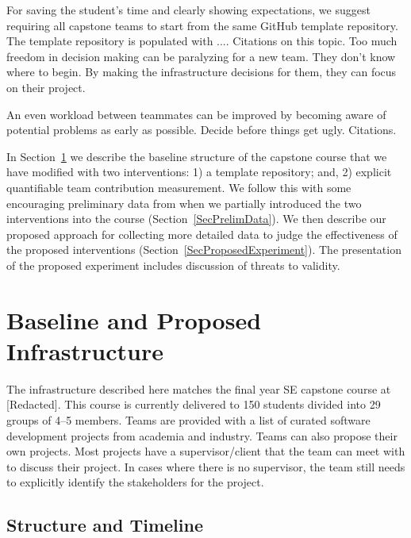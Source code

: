 \documentclass[10pt, conference]{IEEEtran}
\begin{document}
For saving the student's time and clearly showing expectations, we suggest
requiring all capstone teams to start from the same GitHub template repository.
The template repository is populated with ....  Citations on this topic. Too much freedom in decision making can be paralyzing for a new team.  They don't know where to begin.  By making the infrastructure decisions for them, they can focus on their project.

An even workload between teammates can be improved by becoming aware of
potential problems as early as possible. Decide before things get ugly.
Citations.

In Section~\ref{SecInfrastruct} we describe the baseline structure of the
capstone course that we have modified with two interventions: 1) a template
repository; and, 2) explicit quantifiable team contribution measurement. We
follow this with some encouraging preliminary data from when we partially
introduced the two interventions into the course (Section~\ref{SecPrelimData}).
We then describe our proposed approach for collecting more detailed data to
judge the effectiveness of the proposed interventions
(Section~\ref{SecProposedExperiment}). The presentation of the proposed
experiment includes discussion of threats to validity.

\section{Baseline and Proposed Infrastructure} \label{SecInfrastruct}

The infrastructure described here matches the final year SE capstone course at
[Redacted]. %
This course is currently delivered to 150 students divided into 29 groups of
4--5 members. Teams are provided with a list of curated software development
projects from academia and industry. Teams can also propose their own projects.
Most projects have a supervisor/client that the team can meet with to discuss
their project.  In cases where there is no supervisor, the team still needs to
explicitly identify the stakeholders for the project.

\subsection{Structure and Timeline} \label{Sec_Structure}
\end{document}
